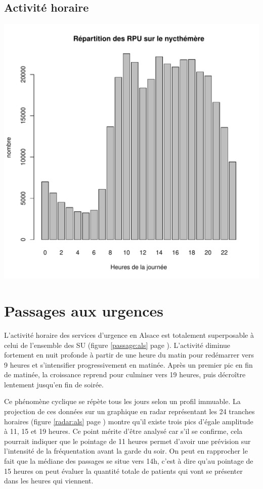 \documentclass[12pt,english,french,twoside]{book}\usepackage[]{graphicx}\usepackage[]{color}
\makeatletter
\def\maxwidth{ %
  \ifdim\Gin@nat@width>\linewidth
    \linewidth
  \else
    \Gin@nat@width
  \fi
}
\newenvironment{knitrout}{}{} %
\makeatother
\begin{document}
\subsection*{Activité horaire}
\begin{knitrout}
\color{fgcolor}
\includegraphics[width=\maxwidth]{figure/activite_heure} 

\end{knitrout}


  


\section{Passages aux urgences}


L'activité horaire des services d'urgence en Alsace est totalement superposable à celui de l'ensemble des SU (figure \ref{passage:als} page \pageref{passage:als}). L'activité diminue fortement en nuit profonde à partir de une heure du matin pour redémarrer vers 9 heures et s'intensifier progressivement en matinée. Après un premier pic en fin de matinée, la croissance reprend pour culminer vers 19 heures, puis décroître lentement jusqu'en fin de soirée.

Ce phénomène cyclique se répète tous les jours selon un profil immuable. La projection de ces données sur un graphique en radar représentant les 24 tranches horaires (figure \ref{radar:als} page \pageref{radar:als}) montre qu'il existe trois pics d'égale amplitude à 11, 15 et 19 heures. Ce point mérite d'être analysé car s'il se confirme, cela pourrait indiquer que le pointage de 11 heures permet d'avoir une prévision sur l'intensité de la fréquentation avant la garde du soir. On peut en rapprocher le fait que la médiane des passages se situe vers 14h, c'est à dire qu'au pointage de 15 heures on peut évaluer la quantité totale de patients qui vont se présenter dans les heures qui viennent.
\end{document}
